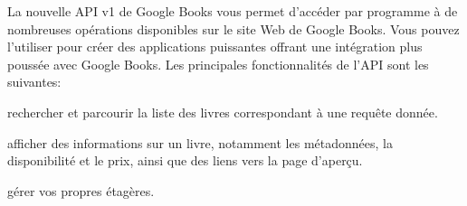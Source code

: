 La nouvelle API v1 de Google Books vous permet d'accéder par programme à de nombreuses opérations disponibles sur le site Web de Google Books. Vous pouvez l'utiliser pour créer des applications puissantes offrant une intégration plus poussée avec Google Books. Les principales fonctionnalités de l'API sont les suivantes:

\begin{list}{•}{}
\item rechercher et parcourir la liste des livres correspondant à une requête donnée.
\item afficher des informations sur un livre, notamment les métadonnées, la disponibilité et le prix, ainsi que des liens vers la page d'aperçu.
\item gérer vos propres étagères.
\end{list}